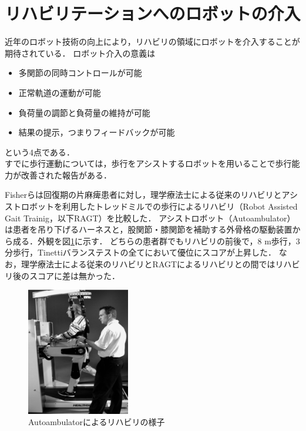\section{リハビリテーションへのロボットの介入}
\label{sec:robotics_chap1}
近年のロボット技術の向上により，リハビリの領域にロボットを介入することが期待されている．
ロボット介入の意義は
\begin{itemize}
	\item 多関節の同時コントロールが可能
	\item 正常軌道の運動が可能
	\item 負荷量の調節と負荷量の維持が可能
	\item 結果の提示，つまりフィードバックが可能
\end{itemize}
という4点である\cite{道免2015}．\\

すでに歩行運動については，歩行をアシストするロボットを用いることで歩行能力が改善された報告がある\cite{Fisher2011}\cite{Srivastava2016}\cite{有末2015}．

Fisherらは回復期の片麻痺患者に対し，理学療法士による従来のリハビリとアシストロボットを利用したトレッドミルでの歩行によるリハビリ（Robot Assisted Gait Trainig，以下RAGT）を比較した．
アシストロボット（Autoambulator）は患者を吊り下げるハーネスと，股関節・膝関節を補助する外骨格の駆動装置から成る．外観を図\ref{fig:autoambulator}に示す．
どちらの患者群でもリハビリの前後で，8 m歩行，3分歩行，Tinettiバランステストの全てにおいて優位にスコアが上昇した．
なお，理学療法士による従来のリハビリとRAGTによるリハビリとの間ではリハビリ後のスコアに差は無かった．

\begin{figure}[b]
	\begin{center}
		\includegraphics[width=4.5cm]{./Chap1/fig/Autoambulator.PNG}
		\caption{Autoambulatorによるリハビリの様子\cite{Fisher2011}}
		\label{fig:autoambulator}
	\end{center}
\end{figure}

